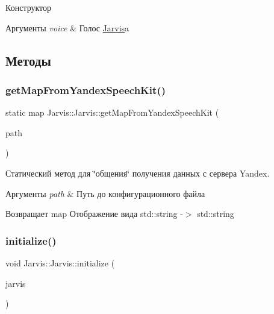 Конструктор 


\begin{DoxyParams}{Аргументы}
{\em voice} & Голос \hyperlink{classJarvis_1_1Jarvis}{Jarvis}\textquotesingle{}a \\
\hline
\end{DoxyParams}


\subsection{Методы}
\mbox{\label{classJarvis_1_1Jarvis_a5e7d9053e69eee8154c68e2bc86e7362}} 
\subsubsection{\texorpdfstring{get\+Map\+From\+Yandex\+Speech\+Kit()}{getMapFromYandexSpeechKit()}}
{\footnotesize\ttfamily static map Jarvis\+::\+Jarvis\+::get\+Map\+From\+Yandex\+Speech\+Kit (\begin{DoxyParamCaption}\item[{const path\+To\+Configs \&}]{path }\end{DoxyParamCaption})\hspace{0.3cm}{\ttfamily [static]}}



Статический метод для \char`\"{}общения\char`\"{} получения данных с сервера Yandex. 


\begin{DoxyParams}{Аргументы}
{\em path} & Путь до конфигурационного файла \\
\hline
\end{DoxyParams}
\begin{DoxyReturn}{Возвращает}
map Отображение вида std\+::string -\/$>$ std\+::string 
\end{DoxyReturn}
\mbox{\label{classJarvis_1_1Jarvis_a1453f3e7f2587b7b884525c75d8b8cf5}} 
\subsubsection{\texorpdfstring{initialize()}{initialize()}}
{\footnotesize\ttfamily void Jarvis\+::\+Jarvis\+::initialize (\begin{DoxyParamCaption}\item[{\hyperlink{classJarvis_1_1Jarvis}{Jarvis} $\ast$}]{jarvis }\end{DoxyParamCaption})}



